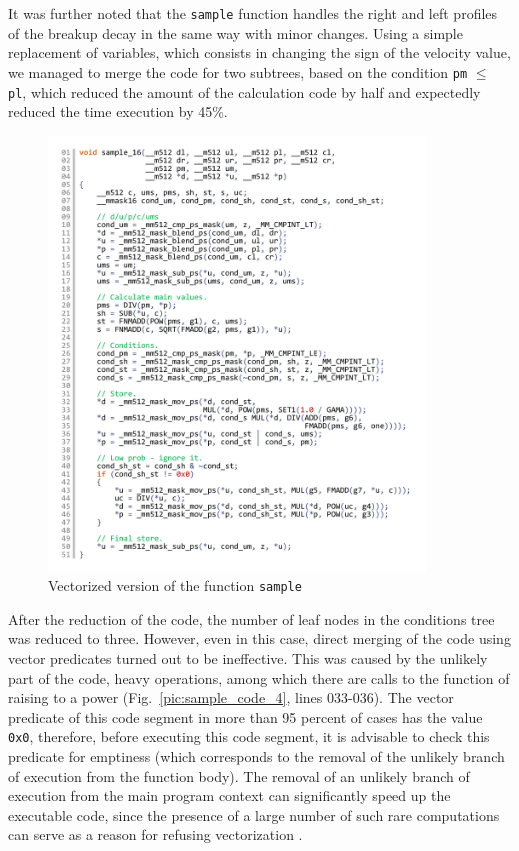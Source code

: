 \documentclass[utf8,english]{psta}%
\begin{document}
It was further noted that the \texttt{sample} function handles the right and left profiles of the breakup decay in the same way with minor changes.
Using a simple replacement of variables, which consists in changing the sign of the velocity value, we managed to merge the code for two subtrees, based on the condition \texttt{pm} $\le$ \texttt{pl}, which reduced the amount of the calculation code by half and expectedly reduced the time execution by 45\%.

\begin{figure}
\includegraphics[width=10cm]{pics/pic_sample_16_code}
\caption{Vectorized version of the function \texttt{sample}}
\label{pic:sample_16_code}
\end{figure}

After the reduction of the code, the number of leaf nodes in the conditions tree was reduced to three.
However, even in this case, direct merging of the code using vector predicates turned out to be ineffective.
This was caused by the unlikely part of the code, heavy operations, among which there are calls to the function of raising to a power (Fig.~\ref{pic:sample_code_4}, lines 033-036).
The vector predicate of this code segment in more than 95 percent of cases has the value \texttt{0x0}, therefore, before executing this code segment, it is advisable to check this predicate for emptiness (which corresponds to the removal of the unlikely branch of execution from the function body).
The removal of an unlikely branch of execution from the main program context can significantly speed up the executable code, since the presence of a large number of such rare computations can serve as a reason for refusing vectorization \cite{RybLowProb}.
\end{document}
